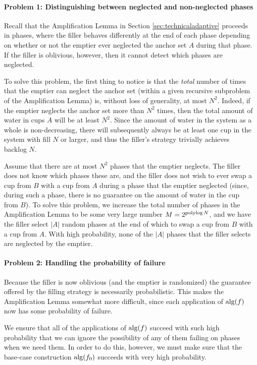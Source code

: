 \paragraph{Problem 1: Distinguishing between neglected and non-neglected phases}
Recall that the Amplification Lemma in Section
\ref{sec:technicaladaptive} proceeds in phases, where the filler
behaves differently at the end of each phase depending on whether or
not the emptier ever neglected the anchor set $A$ during that
phase. If the filler is oblivious, however, then it cannot detect
which phases are neglected.

To solve this problem, the first thing to notice is that the
\emph{total} number of times that the emptier can neglect the anchor
set (within a given recursive subproblem of the Amplification Lemma)
is, without loss of generality, at most $N^2$. Indeed, if the emptier
neglects the anchor set more than $N^2$ times, then the total amount
of water in cups $A$ will be at least $N^2$. Since the amount of water
in the system as a whole is non-decreasing, there will subsequently
always be at least one cup in the system with fill $N$ or larger, and
thus the filler's strategy trivially achieves backlog $N$.

Assume that there are at most $N^2$ phases that the emptier
neglects. The filler does not know which phases these are, and the
filler does not wish to ever swap a cup from $B$ with a cup from $A$
during a phase that the emptier neglected (since, during such a phase,
there is no guarantee on the amount of water in the cup from $B$). To
solve this problem, we increase the total number of phases in the
Amplification Lemma to be some very large number $M = 2^{\operatorname{\text{polylog}} N}$,
and we have the filler select $|A|$ random phases at the end of which
to swap a cup from $B$ with a cup from $A$. With high probability,
none of the $|A|$ phases that the filler selects are neglected by the
emptier.

\paragraph{Problem 2: Handling the probability of failure}
Because the filler is now oblivious (and the emptier is randomized)
the guarantee offered by the filling strategy is necessarily
probabilistic. This makes the Amplification Lemma somewhat more
difficult, since each application of $\operatorname{\text{\textup{alg}}}(f)$ now has some
probability of failure.

We ensure that all of the applications of $\operatorname{\text{\textup{alg}}}(f)$ succeed with
such high probability that we can ignore the possibility of any
of them failing on phases when we need them. In order to do this,
however, we must make sure that the base-case construction
$\operatorname{\text{\textup{alg}}}(f_0)$ succeeds with very high probability.

